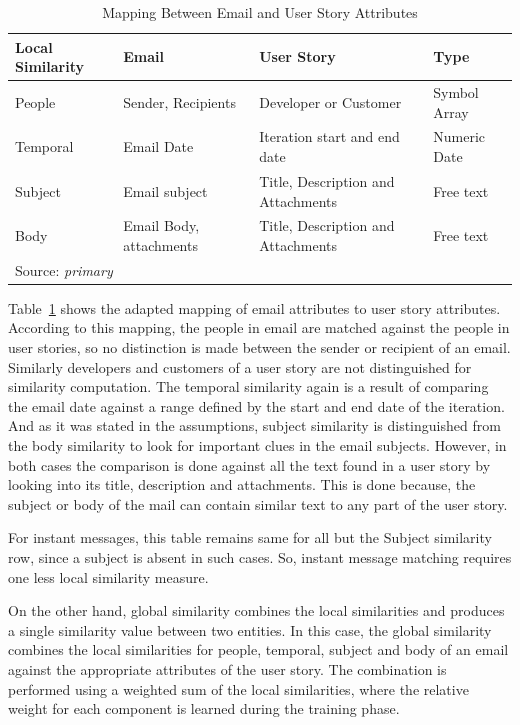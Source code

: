 \begin{table}[at]
  \centering
  \caption{Mapping Between Email and User Story Attributes}
    \begin{tabular}{|p{2.5cm}|p{4cm}|p{5cm}|p{2cm}|}
      \hline
      \textbf{Local Similarity} & \textbf{Email} & \textbf{User Story} & \textbf{Type} \\
      \hline
      People & Sender, Recipients & Developer or Customer & Symbol Array\\      
      \hline
      Temporal & Email Date & Iteration start and end date & Numeric Date \\
      \hline
      Subject & Email subject & Title, Description and Attachments & Free text\\
      \hline
      Body & Email Body, attachments & Title, Description and Attachments & Free text\\
      \hline
      \multicolumn{4}{l}{Source: \emph{primary}}
    \end{tabular}
	\label{tab:mapping}
\end{table}

Table~\ref{tab:mapping} shows the adapted mapping of email attributes to user story attributes. According to this mapping, the people in email are matched against the people in user stories, so no distinction is made between the sender or recipient of an email. Similarly developers and customers of a user story are not distinguished for similarity computation. The temporal similarity again is a result of comparing the email date against a range defined by the start and end date of the iteration. And as it was stated in the assumptions, subject similarity is distinguished from the body similarity to look for important clues in the email subjects. However, in both cases the comparison is done against all the text found in a user story by looking into its title, description and attachments. This is done because, the subject or body of the mail can contain similar text to any part of the user story.

For instant messages, this table remains same for all but the Subject similarity row, since a subject is absent in such cases. So, instant message matching requires one less local similarity measure.

On the other hand, global similarity combines the local similarities and produces a single similarity value between two entities. In this case, the global similarity combines the local similarities for people, temporal, subject and body of an email against the appropriate attributes of the user story. The combination is performed using a weighted sum of the local similarities, where the relative weight for each component is learned during the training phase.

